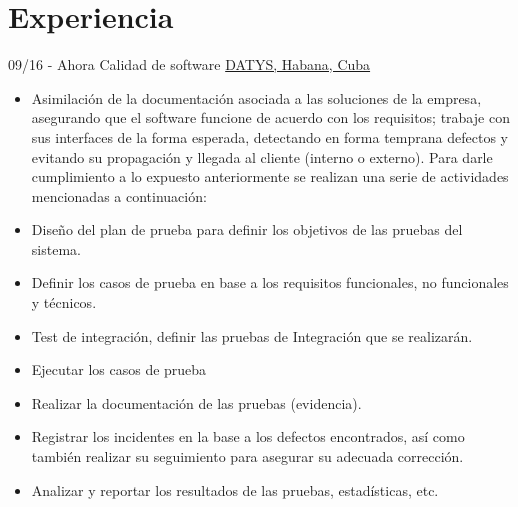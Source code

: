 \documentclass[letterpaper]{twentysecondcves} %
\begin{document}
\makeprofile %
 

\section{Experiencia}

\begin{twenty} %
\twentyitem
    	{09/16 - }
		{Ahora}
        {Calidad de software}
        {\href{http://datys.cu/}{DATYS, Habana, Cuba}}
        {}
        {
        {\begin{itemize}
        \item Asimilación de la documentación asociada a las soluciones de la empresa, asegurando que el software  funcione de acuerdo con los requisitos; trabaje con sus interfaces de la forma esperada, detectando en forma temprana defectos y evitando su propagación y llegada al cliente (interno o externo). Para darle cumplimiento a lo expuesto anteriormente se realizan una serie de actividades mencionadas a continuación:
\item Diseño del plan de prueba para definir los objetivos de las pruebas del sistema.
\item Definir los casos de prueba en base a los requisitos funcionales, no funcionales y técnicos.
\item Test de integración, definir las pruebas de Integración que se realizarán.
\item Ejecutar los casos de prueba
\item Realizar la documentación de las pruebas (evidencia).
\item Registrar los incidentes en la base a los defectos encontrados, así como también realizar su seguimiento para asegurar su adecuada corrección.
\item Analizar y reportar los resultados de las pruebas, estadísticas, etc. 
        \end{itemize}}
        }
        
\end{twenty}

\end{document}
